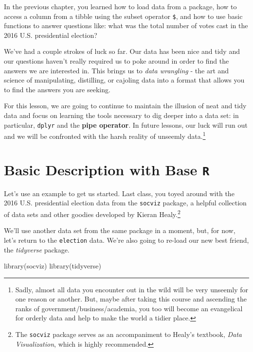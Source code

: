 \documentclass[
  letterpaper,
]{book}
\newenvironment{Shaded}{\begin{snugshade}}{\end{snugshade}}
\newcommand{\FunctionTok}[1]{\textcolor[rgb]{0.28,0.35,0.67}{#1}}
\newcommand{\NormalTok}[1]{\textcolor[rgb]{0.00,0.23,0.31}{#1}}
\begin{document}
In the previous chapter, you learned how to load data from a package,
how to access a column from a tibble using the subset operator
\texttt{\$}, and how to use basic functions to answer questions like:
what was the total number of votes cast in the 2016 U.S. presidential
election?

We've had a couple strokes of luck so far. Our data has been nice and
tidy and our questions haven't really required us to poke around in
order to find the answers we are interested in. This brings us to
\emph{data wrangling} - the art and science of manipulating, distilling,
or cajoling data into a format that allows you to find the answers you
are seeking.

For this lesson, we are going to continue to maintain the illusion of
neat and tidy data and focus on learning the tools necessary to dig
deeper into a data set: in particular, \texttt{dplyr} and the
\textbf{pipe operator}. In future lessons, our luck will run out and we
will be confronted with the harsh reality of unseemly data.\footnote{Sadly,
  almost all data you encounter out in the wild will be very unseemly
  for one reason or another. But, maybe after taking this course and
  ascending the ranks of government/business/academia, you too will
  become an evangelical for orderly data and help to make the world a
  tidier place.}

\hypertarget{basic-description-with-base-r}{%
\section{\texorpdfstring{Basic Description with Base
\texttt{R}}{Basic Description with Base R}}\label{basic-description-with-base-r}}

Let's use an example to get us started. Last class, you toyed around
with the 2016 U.S. presidential election data from the \texttt{socviz}
package, a helpful collection of data sets and other goodies developed
by Kieran Healy.\footnote{The \texttt{socviz} package serves as an
  accompaniment to Healy's textbook, \emph{Data Visualization}, which is
  highly recommended.}

We'll use another data set from the same package in a moment, but, for
now, let's return to the \texttt{election} data. We're also going to
re-load our new best friend, the \emph{tidyverse} package.

\begin{Shaded}
\begin{Highlighting}[]
\FunctionTok{library}\NormalTok{(socviz)}
\FunctionTok{library}\NormalTok{(tidyverse)}
\end{Highlighting}
\end{Shaded}
\end{document}
